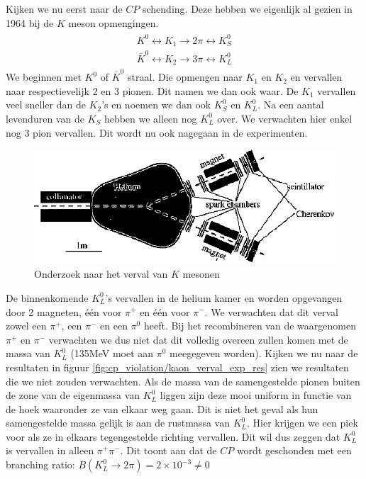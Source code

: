 \documentclass[../main.tex]{subfiles}
\begin{document}
Kijken we nu eerst naar de $CP$ schending. Deze hebben we eigenlijk al gezien in 1964 bij de $K$ meson opmengingen.
\begin{equation}
    \begin{aligned}
        \label{eq:k_mes_osc}
        \begin{array}{l}
            K^{0} \leftrightarrow K_{1} \rightarrow 2 \pi \leftrightarrow K_{S}^{0} \\
            \bar{K}^{0} \leftrightarrow K_{2} \rightarrow 3 \pi \leftrightarrow K_{L}^{0}
        \end{array}
    \end{aligned}
\end{equation}
We beginnen met $K^0$ of $\bar{K}^0$ straal. Die opmengen naar $K_1$ en $K_2$ en vervallen naar respectievelijk 2 en 3 pionen. Dit namen we dan ook waar. De $K_1$ vervallen veel sneller dan de $K_2$'s en noemen we dan ook $K_S^0$ en $K_L^0$. Na een aantal levenduren van de $K_S$ hebben we alleen nog $K_L^0$ over. We verwachten hier enkel nog 3 pion vervallen. Dit wordt nu ook nagegaan in de experimenten.

\begin{figure}[h]
    \centering
    \includegraphics[width=0.7\linewidth]{cp_violation/kaon_verval_exp.png}
    \caption{Onderzoek naar het verval van $K$ mesonen}%
    \label{fig:cp_violation/kaon_verval_exp}
\end{figure}

De binnenkomende $K_L^0$'s vervallen in de helium kamer en worden opgevangen door 2 magneten, één voor $\pi^+$ en één voor $\pi^-$. We verwachten dat dit verval zowel een $\pi^+$, een $\pi^-$ en een $\pi^0$ heeft. Bij het recombineren van de waargenomen $\pi^+$ en $\pi^-$ verwachten we dus niet dat dit volledig overeen zullen komen met de massa van $K_L^0$ (135MeV moet aan $\pi^0$ meegegeven worden). Kijken we nu naar de resultaten in figuur \ref{fig:cp_violation/kaon_verval_exp_res} zien we resultaten die we niet zouden verwachten. Als de massa van de samengestelde pionen buiten de zone van de eigenmassa van $K_L^0$ liggen zijn deze mooi uniform in functie van de hoek waaronder ze van elkaar weg gaan. Dit is niet het geval als hun samengestelde massa gelijk is aan de rustmassa van $K_L^0$. Hier krijgen we een piek voor als ze in elkaars tegengestelde richting vervallen. Dit wil dus zeggen dat $K_L^0$ is vervallen in alleen $\pi^+\pi^-$. Dit toont aan dat de $CP$ wordt geschonden met een branching ratio: $B\left(K_{L}^{0} \rightarrow 2 \pi\right)=2 \times 10^{-3} \neq 0$
\end{document}
